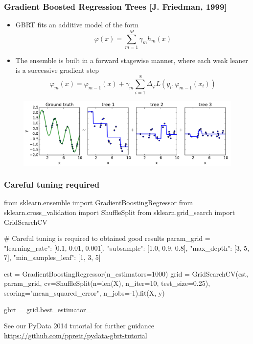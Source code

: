 \documentclass{beamer}
\begin{document}
\begin{frame}
  \frametitle{Gradient Boosted Regression Trees [J. Friedman, 1999]}

  \begin{itemize}
  \item GBRT fits an additive model of the form
  $$\varphi(x) =  \sum_{m=1}^M \gamma_m h_m(x)$$

  \item The ensemble is built in a forward stagewise manner, where each weak leaner is a successive
        gradient step
        $$\varphi_m(x) =  \varphi_{m-1}(x) + \gamma_m \sum_{i=1}^N \Delta_\varphi L(y_i, \varphi_{m-1}(x_i))$$
  \end{itemize}

    \begin{figure}
       \centering
       \includegraphics[width=\textwidth]{./figures/residual_fitting_2.pdf}
    \end{figure}

\end{frame}

\begin{frame}[fragile]
  \frametitle{Careful tuning required}

{\scriptsize
\begin{pythoncode}
from sklearn.ensemble import GradientBoostingRegressor
from sklearn.cross_validation import ShuffleSplit
from sklearn.grid_search import GridSearchCV

# Careful tuning is required to obtained good results
param_grid = {"learning_rate": [0.1, 0.01, 0.001],
              "subsample": [1.0, 0.9, 0.8],
              "max_depth": [3, 5, 7],
              "min_samples_leaf": [1, 3, 5]}

est = GradientBoostingRegressor(n_estimators=1000)
grid = GridSearchCV(est, param_grid,
                    cv=ShuffleSplit(n=len(X), n_iter=10, test_size=0.25),
                    scoring="mean_squared_error",
                    n_jobs=-1).fit(X, y)

gbrt = grid.best_estimator_
\end{pythoncode}
}

\begin{center}
See our PyData 2014 tutorial for further guidance
\url{https://github.com/pprett/pydata-gbrt-tutorial}
\end{center}

\end{frame}
\end{document}

